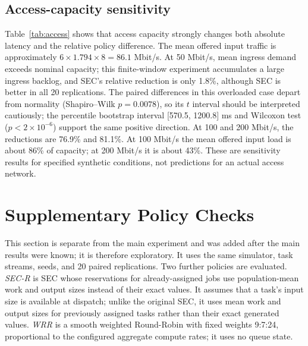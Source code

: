 \documentclass[conference]{IEEEtran}
\begin{document}
\subsection{Access-capacity sensitivity}
Table~\ref{tab:access} shows that access capacity strongly changes both absolute latency and the relative policy difference. The mean offered input traffic is approximately $6\times1.794\times8=86.1$ Mbit/s. At 50 Mbit/s, mean ingress demand exceeds nominal capacity; this finite-window experiment accumulates a large ingress backlog, and SEC's relative reduction is only 1.8\%, although SEC is better in all 20 replications. The paired differences in this overloaded case depart from normality (Shapiro--Wilk $p=0.0078$), so its $t$ interval should be interpreted cautiously; the percentile bootstrap interval [570.5, 1200.8] ms and Wilcoxon test ($p<2\times10^{-6}$) support the same positive direction. At 100 and 200 Mbit/s, the reductions are 76.9\% and 81.1\%. At 100 Mbit/s the mean offered input load is about 86\% of capacity; at 200 Mbit/s it is about 43\%. These are sensitivity results for specified synthetic conditions, not predictions for an actual access network.

\begin{table}[t]
\caption{Access-Capacity Sensitivity at 6 Tasks/s and $m=1$; Both Directions Use the Listed Rate}
\label{tab:access}
\centering
\footnotesize
{}
\end{table}

\section{Supplementary Policy Checks}
\label{sec:supp}
This section is separate from the main experiment and was added after the main results were known; it is therefore exploratory. It uses the same simulator, task streams, seeds, and 20 paired replications. Two further policies are evaluated. \emph{SEC-R} is SEC whose reservations for already-assigned jobs use population-mean work and output sizes instead of their exact values. It assumes that a task's input size is available at dispatch; unlike the original SEC, it uses mean work and output sizes for previously assigned tasks rather than their exact generated values. \emph{WRR} is a smooth weighted Round-Robin with fixed weights 9:7:24, proportional to the configured aggregate compute rates; it uses no queue state.
\end{document}
